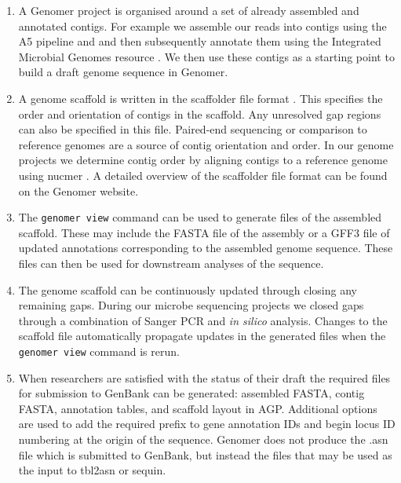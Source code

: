 \documentclass[10pt]{article}
\begin{document}
\begin{enumerate}

  \item{A Genomer project is organised around a set of already assembled and
  annotated contigs. For example we assemble our reads into contigs using the
  A5 pipeline \cite{tritt2012} and and then subsequently annotate them using
  the Integrated Microbial Genomes resource \cite{markowitz2006}. We then use
  these contigs as a starting point to build a draft genome sequence in
  Genomer.}

  \item{A genome scaffold is written in the scaffolder file format
  \cite{barton2012}. This specifies the order and orientation of contigs in the
  scaffold. Any unresolved gap regions can also be specified in this file.
  Paired-end sequencing or comparison to reference genomes are a source of
  contig orientation and order. In our genome projects we determine contig
  order by aligning contigs to a reference genome using nucmer
  \cite{kurtz2004}. A detailed overview of the scaffolder file format can be
  found on the Genomer website.}

  \item{The \verb+genomer view+ command can be used to generate files of the
  assembled scaffold. These may include the FASTA file of the assembly or a
  GFF3 file of updated annotations corresponding to the assembled genome
  sequence. These files can then be used for downstream analyses of the
  sequence.}

  \item{The genome scaffold can be continuously updated through closing any
  remaining gaps. During our microbe sequencing projects we closed gaps through
  a combination of Sanger PCR and \emph{in silico} analysis. Changes to the
  scaffold file automatically propagate updates in the generated files when the
  \verb+genomer view+ command is rerun.}

  \item{When researchers are satisfied with the status of their draft the
  required files for submission to GenBank can be generated: assembled FASTA,
  contig FASTA, annotation tables, and scaffold layout in AGP. Additional
  options are used to add the required prefix to gene annotation IDs and begin
  locus ID numbering at the origin of the sequence. Genomer does not produce
  the .asn file which is submitted to GenBank, but instead the files that may
  be used as the input to tbl2asn or sequin. }

\end{enumerate}
\end{document}
